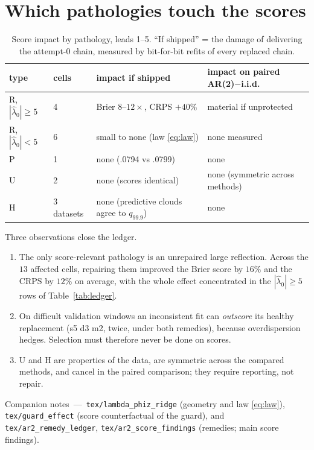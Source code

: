\documentclass[11pt]{article}
\newcommand{\code}[1]{\texttt{#1}}
\begin{document}
\section{Which pathologies touch the scores}

\begin{table}[ht]
\centering
\caption{Score impact by pathology, leads 1--5. ``If shipped'' = the
damage of delivering the attempt-0 chain, measured by bit-for-bit refits
of every replaced chain.}
\label{tab:impact}
\small
\begin{tabular}{llll}
\toprule
type & cells & impact if shipped & impact on paired AR(2)$-$i.i.d. \\
\midrule
R, $|\hat\lambda_0| \ge 5$ & 4 & Brier $8$--$12\times$, CRPS $+40\%$ & material if unprotected \\
R, $|\hat\lambda_0| < 5$   & 6 & small to none (law \eqref{eq:law})   & none measured \\
P                          & 1 & none (.0794 vs .0799)                & none \\
U                          & 2 & none (scores identical)              & none (symmetric across methods) \\
H                          & 3 datasets & none (predictive clouds agree to $q_{99.9}$) & none \\
\bottomrule
\end{tabular}
\end{table}

Three observations close the ledger.

\begin{enumerate}\itemsep2pt
  \item The only score-relevant pathology is an unrepaired large
        reflection. Across the $13$ affected cells, repairing them
        improved the Brier score by $16\%$ and the CRPS by $12\%$ on
        average, with the whole effect concentrated in the
        $|\hat\lambda_0| \ge 5$ rows of Table~\ref{tab:ledger}.
  \item On difficult validation windows an inconsistent fit can
        \emph{outscore} its healthy replacement (s5 d3 m2, twice, under
        both remedies), because overdispersion hedges. Selection must
        therefore never be done on scores.
  \item U and H are properties of the data, are symmetric across the
        compared methods, and cancel in the paired comparison; they
        require reporting, not repair.
\end{enumerate}

Companion notes\, --- \,\code{tex/lambda\_phiz\_ridge} (geometry and law
\eqref{eq:law}), \code{tex/guard\_effect} (score counterfactual of the
guard), and \code{tex/ar2\_remedy\_ledger}, \code{tex/ar2\_score\_findings}
(remedies; main score findings).
\end{document}
